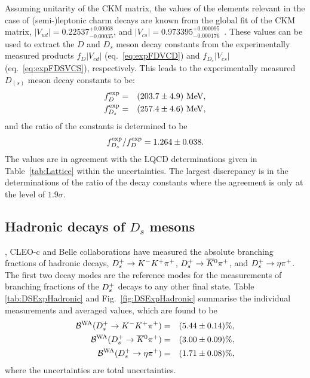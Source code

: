 Assuming unitarity of the CKM matrix, the values of the elements relevant in the case of \mbox{(semi-)leptonic} charm decays are known from the global fit
of the CKM matrix, $|V_{ud}|=0.22537^{+0.00068}_{-0.00035}$, and $|V_{cs}|=0.973395^{+0.000095}_{-0.000176}$~\cite{PDG_2014}. These values can be used to extract
the $D$ and $D_s$ meson decay constants from the experimentally measured products $f_{D}|V_{cd}|$ (eq.~\ref{eq:expFDVCD}) and $f_{D_s}|V_{cs}|$ (eq.~\ref{eq:expFDSVCS}),
respectively. This leads to the experimentally measured $D_{(s)}$ meson decay constants to be:
\begin{eqnarray}
f_D^{\rm exp} & = & (203.7\pm4.9)~{\rm MeV,}\\ 
f_{D_s}^{\rm exp} & = & (257.4\pm4.6)~{\rm MeV,}
\end{eqnarray}
and the ratio of the constants is determined to be
\begin{equation}
f_{D_s}^{\rm exp}/f_D^{\rm exp} = 1.264\pm0.038.
\label{eq:fDsfDRatio:WA}
\end{equation}
The values are in agreement with the LQCD determinations given in Table~\ref{tab:Lattice} within the uncertainties. The largest discrepancy is in the determinations of 
the ratio of the decay constants where the agreement is only at the level of $1.9\sigma$.


\clearpage
\subsection{Hadronic decays of $D_s$ mesons}

\babar, CLEO-c and Belle collaborations have measured the absolute branching fractions of hadronic decays, $D_{s}^+\to K^-K^+\pi^+$, $D_{s}^+\to \overline{K}{}^0\pi^+$, and $D_{s}^+ \to \eta\pi^+$. The first two 
decay modes are the reference modes for the measurements of branching fractions of the $D_{s}^+$ decays to any other final state. Table \ref{tab:DSExpHadronic} and 
Fig.~\ref{fig:DSExpHadronic} summarise the individual measurements and averaged values, which are found to be 
\begin{eqnarray}
{\cal B}^{\rm WA}(D_{s}^+\to K^-K^+\pi^+) & = & (5.44\pm0.14)\%,\\
{\cal B}^{\rm WA}(D_{s}^+\to \overline{K}{}^0\pi^+) & = & (3.00\pm0.09)\%,\\
{\cal B}^{\rm WA}(D_{s}^+\to \eta\pi^+) & = & (1.71\pm0.08)\%,
\end{eqnarray}
where the uncertainties are total uncertainties. 

